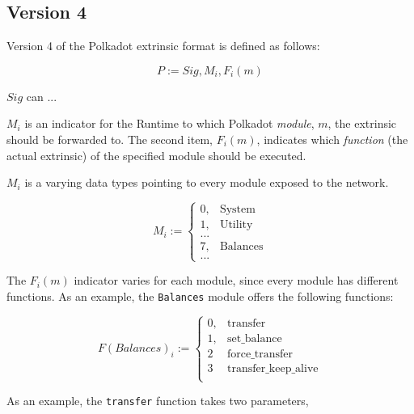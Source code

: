 \subsection{Version 4}

Version 4 of the Polkadot extrinsic format is defined as follows:

\[
    P := Sig, M_i, F_i(m)
\]

$Sig$ can ...
\newline

$M_i$ is an indicator for the Runtime to which Polkadot \textit{module}, $m$,
the extrinsic should be forwarded to. The second item, $F_i(m)$, indicates
which \textit{function} (the actual extrinsic) of the specified module should
be executed.
\newline

$M_i$ is a varying data types pointing to every module exposed to the network.

\[
M_i :=
\begin{cases}
0, & \text{System} \\
1, & \text{Utility} \\
... & \\
7, & \text{Balances} \\
... &
\end{cases}
\]

The $F_i(m)$ indicator varies for each module, since every module has different
functions. As an example, the \verb|Balances| module offers the following
functions:

\[
F(Balances)_i :=
\begin{cases}
0, & \text{transfer} \\
1, & \text{set\_balance} \\
2 & \text{force\_transfer} \\
3 & \text{transfer\_keep\_alive} \\
\end{cases}
\]

As an example, the \verb|transfer| function takes two parameters, 
